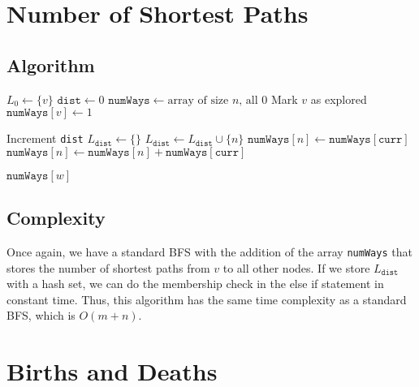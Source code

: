 \documentclass[12pt]{article}
\begin{document}
\section{Number of Shortest Paths}

\subsection*{Algorithm}

\begin{algorithmic}[1]
    \State $L_0 \gets \{v\}$
    \State $\texttt{dist} \gets 0$
    \State $\texttt{numWays} \gets \text{array of size }n\text{, all }0$
    \State Mark $v$ as explored
    \State $\texttt{numWays}[v] \gets 1$

    \item[]
        \State Increment \texttt{dist}
        \State $L_{\texttt{dist}} \gets \{\}$
                    \State $L_{\texttt{dist}} \gets L_{\texttt{dist}} \cup \{n\}$
                    \State $\texttt{numWays}[n] \gets \texttt{numWays}[\texttt{curr}]$
                    \State $\texttt{numWays}[n] \gets \texttt{numWays}[n] + \texttt{numWays}[\texttt{curr}]$
                \EndIf
            \EndFor
        \EndFor
    \EndWhile

    \item[]
    \State \Return $\texttt{numWays}[w]$
\end{algorithmic}

\subsection*{Complexity}

Once again, we have a standard BFS with the addition of the array \texttt{numWays}
that stores the number of shortest paths from $v$ to all other nodes.
If we store $L_{\texttt{dist}}$ with a hash set, we can do the membership check
in the else if statement in constant time.
Thus, this algorithm has the same time complexity as a standard BFS,
which is $O(m+n)$.

\pagebreak

\section{Births and Deaths}
\end{document}
